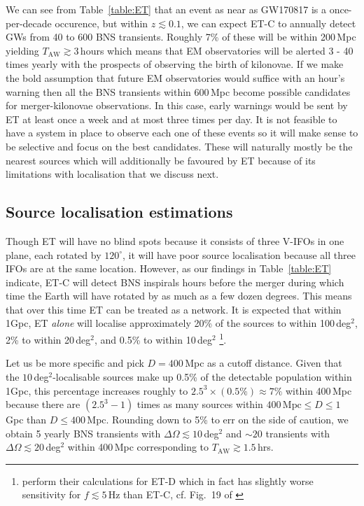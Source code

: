 \documentclass{aa}
\begin{document}
We can see from Table~\ref{table:ET} that an event as near as GW170817 is a once-per-decade occurence,
but within $z\lesssim 0.1$, we can expect ET-C to annually detect GWs from 40 to 600 BNS transients.
Roughly 7\% of these will be within 200\,Mpc yielding $T_\text{AW}\gtrsim 3\,$hours which means that EM observatories will be alerted 3 - 40 times yearly with the prospects of observing the birth of kilonovae.
If we make the bold assumption that future EM observatories would suffice with an hour's warning then
all the BNS transients within 600\,Mpc become possible candidates for merger-kilonovae observations.
In this case, early warnings would be sent by ET at least once a week and at most three times per day.
It is not feasible to have a system in place to observe each one of these events
so it will make sense to be selective and focus on the best candidates.
These  will naturally mostly be the nearest sources which will additionally be favoured by ET because of its limitations with localisation that we discuss next.

\subsection{Source localisation estimations}
Though ET will have no blind spots because it consists of three V-IFOs in one plane, each rotated by $120^\circ$,
it will have poor source localisation because all three IFOs are at the same location. 
However, as our findings in Table~\ref{table:ET} indicate, ET-C will
detect BNS inspirals hours before the merger during which time the Earth will have rotated by as much as
a few dozen degrees. This means that over this time ET can be treated as a network.
It is expected that within 1Gpc, ET \emph{alone} will localise approximately 20\% of the sources to within 100\,deg$^2$, 
2\% to within 20\,deg$^2$, and 0.5\% to within 10\,deg$^2$ \citep{Zhao:2017cbb} 
\footnote{\cite{Zhao:2017cbb} perform their calculations for ET-D which in fact has slightly worse sensitivity for $f\lesssim 5\,$Hz than ET-C, cf. Fig.~19 of \cite{GW_IFO_LRR}}.

Let us be more specific and pick $D=400\,$Mpc as a cutoff distance. Given that the $10\,$deg$^{2}$-localisable
sources make up 0.5\% of the detectable population within 1Gpc, this percentage increases roughly to $2.5^3\times (0.5\%)\approx 7\%$ within 400\,Mpc because 
there are $ (2.5^3-1)$ times as many sources within $400\,\text{Mpc}\le D\le 1\,$Gpc than $D\le 400\,$Mpc.
Rounding down to 5\% to err on the side of caution, we obtain 5 yearly BNS transients with $\Delta\Omega \lesssim 10\,$deg$^2$ and $\sim20$ transients with $\Delta\Omega \lesssim 20\,$deg$^2$ within 400\,Mpc corresponding to $T_\text{AW}\gtrsim 1.5\,$hrs.
\end{document}
